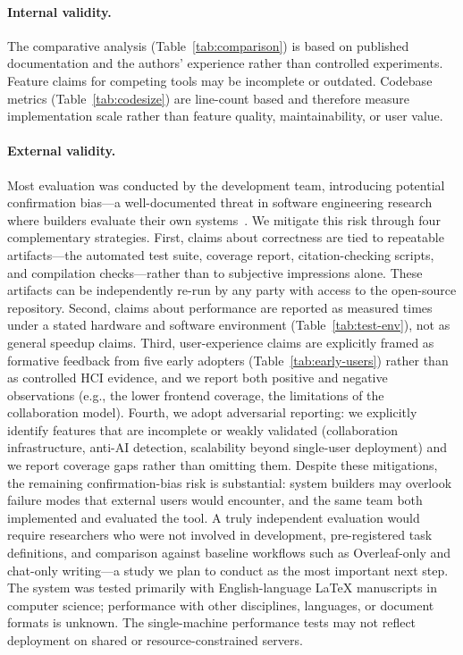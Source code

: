 \paragraph{Internal validity.}
The comparative analysis (Table~\ref{tab:comparison}) is based on published
documentation and the authors' experience rather than controlled experiments.
Feature claims for competing tools may be incomplete or outdated. Codebase
metrics (Table~\ref{tab:codesize}) are line-count based and therefore measure
implementation scale rather than feature quality, maintainability, or user
value.

\paragraph{External validity.}
Most evaluation was conducted by the development team, introducing potential
confirmation bias---a well-documented threat in software engineering research
where builders evaluate their own systems~\cite{wohlin2014experimentation}.
We mitigate this risk through four complementary strategies. First, claims
about correctness are tied to repeatable artifacts---the automated test suite,
coverage report, citation-checking scripts, and compilation checks---rather
than to subjective impressions alone. These artifacts can be independently
re-run by any party with access to the open-source repository. Second,
claims about performance are reported as measured times under a stated
hardware and software environment (Table~\ref{tab:test-env}), not as
general speedup claims. Third, user-experience claims are explicitly framed
as formative feedback from five early adopters (Table~\ref{tab:early-users})
rather than as controlled HCI evidence, and we report both positive and
negative observations (e.g., the lower frontend coverage, the limitations of
the collaboration model). Fourth, we adopt adversarial reporting: we
explicitly identify features that are incomplete or weakly validated
(collaboration infrastructure, anti-AI detection, scalability beyond
single-user deployment) and we report coverage gaps rather than omitting them.
Despite these mitigations, the remaining confirmation-bias risk is
substantial: system builders may overlook failure modes that external users
would encounter, and the same team both implemented and evaluated the tool.
A truly independent evaluation would require researchers who were not involved
in development, pre-registered task definitions, and comparison against
baseline workflows such as Overleaf-only and chat-only writing---a study we
plan to conduct as the most important next step. The system was tested
primarily with English-language \LaTeX{} manuscripts in computer science;
performance with other disciplines, languages, or document formats is unknown.
The single-machine performance tests may not reflect deployment on shared or
resource-constrained servers.

